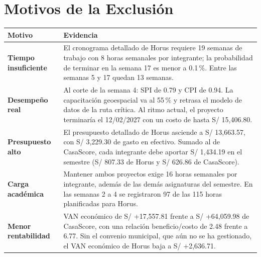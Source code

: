 \documentclass[11pt,a4paper]{article}
\begin{document}
\section{Motivos de la Exclusión}
{\small
\noindent\begin{tabularx}{\textwidth}{@{}P{3.0cm} L@{}}
\toprule
{}
\textbf{Motivo} & \textbf{Evidencia} \\
\midrule
\textbf{Tiempo insuficiente} & El cronograma detallado de Horus requiere 19 semanas de trabajo con 8 horas semanales por integrante; la probabilidad de terminar en la semana 17 es menor a 0.1\,\%. Entre las semanas 5 y 17 quedan 13 semanas. \\
\addlinespace[2pt]
\textbf{Desempeño real} & Al corte de la semana 4: SPI de 0.79 y CPI de 0.94. La capacitación geoespacial va al 55\,\% y retrasa el modelo de datos de la ruta crítica. Al ritmo actual, el proyecto terminaría el 12/02/2027 con un costo de hasta S/ 15,406.80. \\
\addlinespace[2pt]
\textbf{Presupuesto alto} & El presupuesto detallado de Horus asciende a S/ 13,663.57, con S/ 3,229.30 de gasto en efectivo. Sumado al de CasaScore, cada integrante debe aportar S/ 1,434.19 en el semestre (S/ 807.33 de Horus y S/ 626.86 de CasaScore). \\
\addlinespace[2pt]
\textbf{Carga académica} & Mantener ambos proyectos exige 16 horas semanales por integrante, además de las demás asignaturas del semestre. En las semanas 2 a 4 se registraron 97 de las 115 horas planificadas para Horus. \\
\addlinespace[2pt]
\textbf{Menor rentabilidad} & VAN económico de S/ +17,557.81 frente a S/ +64,059.98 de CasaScore, con una relación beneficio/costo de 2.48 frente a 6.77. Sin el convenio municipal, que aún no se ha gestionado, el VAN económico de Horus baja a S/ +2,636.71. \\
\bottomrule
\end{tabularx}
}

\end{document}
